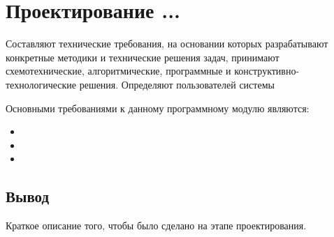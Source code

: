 \section{Проектирование ...}
\label{sec:designing}

Составляют технические требования, на основании которых разрабатывают конкретные методики и технические решения задач, принимают схемотехнические, алгоритмические, программные и конструктивно-технологические решения. Определяют пользователей системы

Основными требованиями к данному программному модулю являются:
\begin{itemize}
    \item
    \item
    \item
\end{itemize}



\subsection{Вывод}
Краткое описание того, чтобы было сделано на этапе проектирования.
